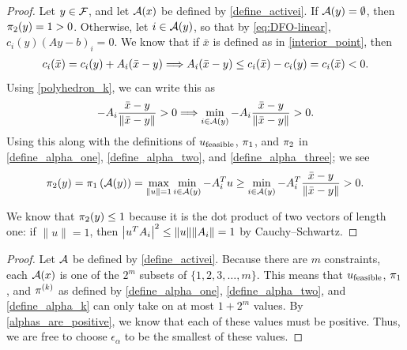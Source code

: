 \documentclass{article}
\begin{document}
\begin{proof}

Let $y \in {\mathcal F}$, and let ${\mathcal A}(x)$ be defined by \cref{define_activei}.
If ${\mathcal A}(y) = \emptyset$, then $\pi_2(y) = 1 > 0$.
Otherwise, let $i \in {\mathcal A}(y)$, so that by \cref{eq:DFO-linear}, $c_i(y) (Ay - b)_i= 0$.
We know that if $\bar x$ is defined as in \cref{interior_point}, then
\begin{align*}
c_i(\bar x) = c_i(y) + {{A}}_i(\bar x - y)
\Longrightarrow {{A}}_i(\bar x - y) \le c_i(\bar x) - c_i(y) = c_i(\bar x) < 0.
\end{align*}
Using \cref{polyhedron_k}, we can write this as
\begin{align*}
-{{A}}_i\frac {\bar x - y}{\|\bar x - y\|} > 0  \Longrightarrow \min_{i \in {\mathcal A}(y)} -{{A}}_i\frac {\bar x - y}{\|\bar x - y\|} > 0.
\end{align*}
Using this along with the definitions of ${u_{\textrm{feasible}}}$, ${\pi_1}$, and $\pi_2$ in \cref{define_alpha_one}, \cref{define_alpha_two}, and \cref{define_alpha_three}; we see
\begin{align*}
\pi_2(y) = {\pi_1}\left({\mathcal A}(y)\right) = \max_{\|u\| = 1} \min_{i \in {\mathcal A}(y)} -{{A}}_i^Tu
\ge \min_{i \in {\mathcal A}(y)} - {{A}}_i^T\frac {\bar x - y}{\|\bar x - y\|} > 0.
\end{align*}

We know that $\pi_2(y) \le 1$ because it is the dot product of two vectors of length one:
if $\|u\| = 1$, then $\left|u^T {{A}}_i\right|^2 \le \|u\|\|{{A}}_i\| = 1$ by Cauchy–Schwartz.

\end{proof}

\begin{proof}

Let ${\mathcal A}$ be defined by \cref{define_activei}.
Because there are $m$ constraints, each ${\mathcal A}(x)$ is one of the $2^m$ subsets of  $\{1, 2, 3, \ldots, m\}$.
This means that ${u_{\textrm{feasible}}}$, ${\pi_1}$, and $\pi^{(k)}$ as defined by \cref{define_alpha_one}, \cref{define_alpha_two}, and \cref{define_alpha_k} can only take on at most $1 + 2^m$ values.
By \cref{alphas_are_positive}, we know that each of these values must be positive.
Thus, we are free to choose $\epsilon_{\alpha}$ to be the smallest of these values.
\end{proof}
\end{document}
